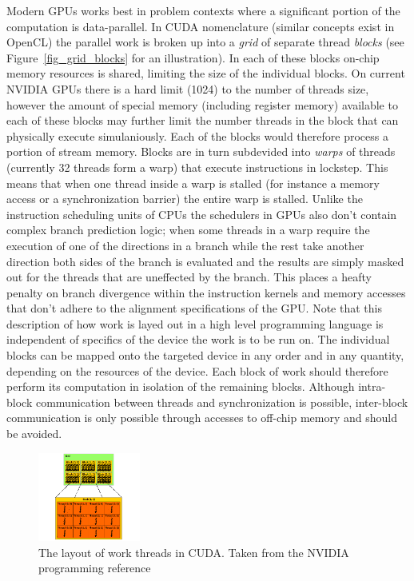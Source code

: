 Modern GPUs works best in problem contexts where a significant portion of the computation is data-parallel. In CUDA nomenclature (similar concepts exist in OpenCL) the parallel work is broken up into a \textit{grid} of
separate thread \textit{blocks} (see Figure~\ref{fig_grid_blocks} for an illustration). In each of these blocks on-chip memory resources is shared, limiting the size of the individual blocks. On current NVIDIA GPUs there is a hard limit (1024) to the number of threads size, 
however the amount of special memory (including register memory) available to each of these blocks may further limit the number threads in the block that can physically execute simulaniously. Each of the 
blocks would therefore process a portion of stream memory. Blocks are in turn subdevided into \textit{warps} of threads (currently 32 threads form a warp) that execute instructions in lockstep. This means that when one
thread inside a warp is stalled (for instance a memory access or a synchronization barrier) the entire warp is stalled. Unlike the instruction scheduling units of CPUs the schedulers in GPUs also don't contain complex branch prediction logic; when some
threads in a warp require the execution of one of the directions in a branch while the rest take another direction both sides of the branch is evaluated and the results are simply masked out for the threads that are uneffected
by the branch. This places a heafty penalty on branch divergence within the instruction kernels and memory accesses that don't adhere to the alignment specifications of the GPU. Note that this description of how work is layed out in a high level programming language is independent of specifics of the device the work is to be run on. The individual blocks can be mapped onto the targeted device
in any order and in any quantity, depending on the resources of the device. Each block of work should therefore perform its computation in isolation of the remaining blocks. Although intra-block communication between threads 
and synchronization is possible, inter-block communication is only possible through accesses to off-chip memory and should be avoided.
\begin{figure}[ht!]
 \begin{mdframed}
  \centering
  \includegraphics[width=0.3\textwidth]{images/grid-of-thread-blocks.png}
  \caption[Thread layout in CUDA]{The layout of work threads in CUDA. Taken from the NVIDIA programming reference \cite{cuda}}
  \label{fig_cpu_gpu_diff}
 \end{mdframed}
\end{figure}

